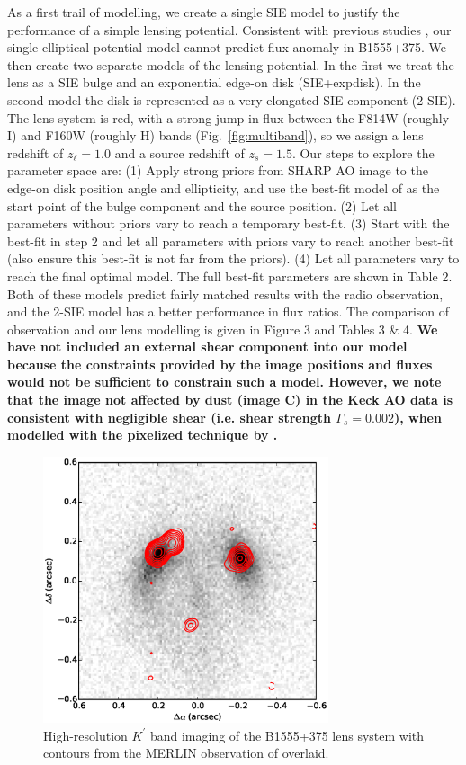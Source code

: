 \documentclass[useAMS,usenatbib]{mn2e}
\begin{document}
As a first trail of modelling, we create a single SIE model to 
justify the performance of a simple lensing potential. Consistent with previous studies
\citep{Marlow99, Xu14}, our single elliptical potential model cannot predict flux anomaly in B1555+375. 
We then create two separate models of the lensing potential.  In the
first we treat the lens as a SIE bulge and an exponential edge-on disk
(SIE+expdisk).  In the second model the disk is represented as a very
elongated SIE component (2-SIE).  The lens system is red, with a
strong jump in flux between the F814W (roughly I) and F160W (roughly
H) bands (Fig.~\ref{fig:multiband}), so we assign a lens redshift of
$z_\ell = 1.0$ and a source redshift of $z_s =1.5$. Our steps to explore the parameter space are: (1) Apply strong priors from SHARP AO image to the edge-on disk position angle and ellipticity, and use the best-fit model of \citet{Marlow99} as the start point of the bulge component and the source position. (2) Let all parameters without priors vary to reach a temporary best-fit. (3) Start with the best-fit in step 2 and let all parameters with priors vary to reach another best-fit (also ensure this best-fit is not far from the priors). (4) Let all parameters vary to reach the final optimal model. 
The full best-fit parameters are shown in Table
2. Both of these models predict fairly matched results with the radio
observation, and the 2-SIE model has a better performance in flux
ratios. The comparison of observation and our lens modelling is given
in Figure 3 and Tables 3 \& 4.
{\bf We have not included an external shear component into our model because the constraints provided by the image positions and  fluxes would not be sufficient 
to constrain such a model. However, we note that the image not affected by dust (image C) in the Keck AO data is consistent with negligible shear (i.e. shear strength $\Gamma_s=0.002$), when modelled with the pixelized technique by \citet{V09}.}

\begin{figure}
\includegraphics[width=84mm]{1555_ao_merlin_overlay.eps}
\caption{High-resolution  $K^\prime$ band imaging of the B1555+375 lens system 
with contours from the MERLIN observation of \citet{Marlow99} overlaid.
%
\label{fig:merlin}}
\end{figure}
\end{document}
